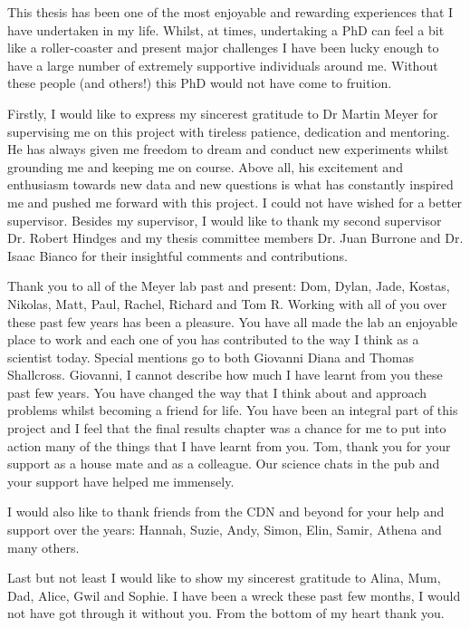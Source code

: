  This thesis has been one of the most enjoyable and rewarding experiences that I have undertaken in my life. Whilst, at times, undertaking a PhD can feel a bit like a roller-coaster and present major challenges I have been lucky enough to have a large number of extremely supportive individuals around me. Without these people (and others!) this PhD would not have come to fruition.
 
 Firstly, I would like to express my sincerest gratitude to Dr Martin Meyer for supervising me on this project with tireless patience, dedication and mentoring. He has always given me freedom to dream and conduct new experiments whilst grounding me and keeping me on course. Above all, his excitement and enthusiasm towards new data and new questions is what has constantly inspired me and pushed me forward with this project. I could not have wished for a better supervisor. Besides my supervisor, I would like to thank my second supervisor Dr. Robert Hindges and my thesis committee members Dr. Juan Burrone and Dr. Isaac Bianco for their insightful comments and contributions.
 
 Thank you to all of the Meyer lab past and present: Dom, Dylan, Jade, Kostas, Nikolas, Matt, Paul, Rachel, Richard and Tom R. Working with all of you over these past few years has been a pleasure. You have all made the lab an enjoyable place to work and each one of you has contributed to the way I think as a scientist today. Special mentions go to both Giovanni Diana and Thomas Shallcross. Giovanni, I cannot describe how much I have learnt from you these past few years. You have changed the way that I think about and approach problems whilst becoming a friend for life. You have been an integral part of this project and I feel that the final results chapter was a chance for me to put into action many of the things that I have learnt from you. Tom, thank you for your support as a house mate and as a colleague. Our science chats in the pub and your support have helped me immensely.
 
 I would also like to thank friends from the CDN and beyond for your help and support over the years: Hannah, Suzie, Andy, Simon, Elin, Samir, Athena and many others.
 
 Last but not least I would like to show my sincerest gratitude to Alina, Mum, Dad, Alice, Gwil and Sophie. I have been a wreck these past few months, I would not have got through it without you. From the bottom of my heart thank you.
 